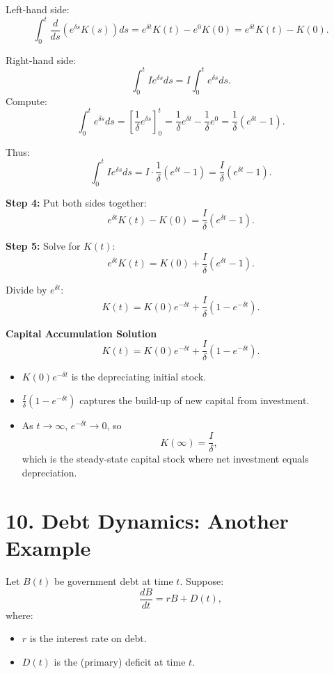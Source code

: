 \documentclass[12pt]{article}
\begin{document}
Left-hand side:
\[
\int_0^t \frac{d}{ds}(e^{\delta s}K(s)) ds = e^{\delta t}K(t) - e^{0}K(0) = e^{\delta t}K(t) - K(0).
\]

Right-hand side:
\[
\int_0^t I e^{\delta s} ds = I \int_0^t e^{\delta s}ds.
\]
Compute:
\[
\int_0^t e^{\delta s}ds = \left[\frac{1}{\delta} e^{\delta s}\right]_0^t = \frac{1}{\delta} e^{\delta t} - \frac{1}{\delta} e^{0} = \frac{1}{\delta}(e^{\delta t} - 1).
\]

Thus:
\[
\int_0^t I e^{\delta s} ds = I \cdot \frac{1}{\delta}(e^{\delta t} - 1) = \frac{I}{\delta}(e^{\delta t} - 1).
\]

\textbf{Step 4:} Put both sides together:
\[
e^{\delta t}K(t) - K(0) = \frac{I}{\delta}(e^{\delta t} - 1).
\]

\textbf{Step 5:} Solve for $K(t)$:
\[
e^{\delta t}K(t) = K(0) + \frac{I}{\delta}(e^{\delta t} - 1).
\]

Divide by $e^{\delta t}$:
\[
K(t) = K(0)e^{-\delta t} + \frac{I}{\delta}(1 - e^{-\delta t}).
\]

\begin{tcolorbox}
\textbf{Capital Accumulation Solution}  
\[
K(t) = K(0)e^{-\delta t} + \frac{I}{\delta}(1 - e^{-\delta t}).
\]

\begin{itemize}
\item $K(0)e^{-\delta t}$ is the depreciating initial stock.
\item $\frac{I}{\delta}(1-e^{-\delta t})$ captures the build-up of new capital from investment.
\item As $t\to\infty$, $e^{-\delta t}\to 0$, so
\[
K(\infty) = \frac{I}{\delta},
\]
which is the steady-state capital stock where net investment equals depreciation.
\end{itemize}
\end{tcolorbox}

\newpage
\section*{10. Debt Dynamics: Another Example}

Let $B(t)$ be government debt at time $t$. Suppose:
\[
\frac{dB}{dt} = rB + D(t),
\]
where:
\begin{itemize}
\item $r$ is the interest rate on debt.
\item $D(t)$ is the (primary) deficit at time $t$.
\end{itemize}
\end{document}
